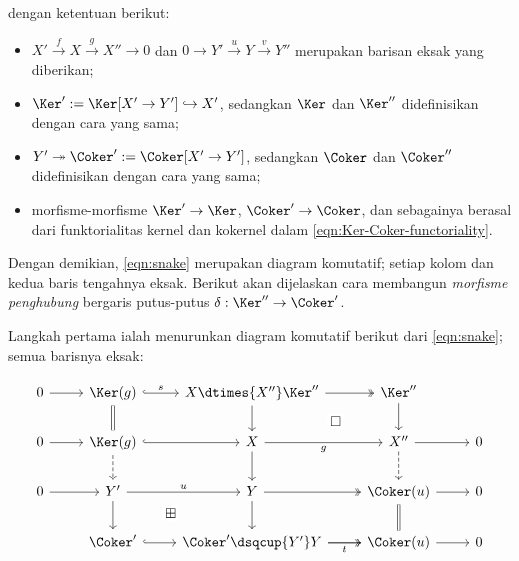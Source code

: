 dengan ketentuan berikut:
\begin{itemize}
	\item $X' \xrightarrow{f} X \xrightarrow{g} X'' \to 0$ dan
	$0 \to Y' \xrightarrow{u} Y \xrightarrow{v} Y''$ merupakan barisan eksak
	yang diberikan;
	\item $\Ker' := \Ker[X' \to Y'] \hookrightarrow X'$, sedangkan $\Ker$ dan
	$\Ker''$ didefinisikan dengan cara yang sama;
	\item $Y' \twoheadrightarrow \Coker' := \Coker[X' \to Y']$, sedangkan
	$\Coker$ dan $\Coker''$ didefinisikan dengan cara yang sama;
	\item morfisme-morfisme $\Ker' \to \Ker$, $\Coker' \to \Coker$, dan
	sebagainya berasal dari funktorialitas kernel dan kokernel dalam
	\eqref{eqn:Ker-Coker-functoriality}.
\end{itemize}

Dengan demikian, \eqref{eqn:snake} merupakan diagram komutatif; setiap
kolom dan kedua baris tengahnya eksak. Berikut akan dijelaskan cara
membangun \emph{morfisme penghubung} bergaris putus-putus
$\delta: \Ker'' \to \Coker'$.

Langkah pertama ialah menurunkan diagram komutatif berikut dari
\eqref{eqn:snake}; semua barisnya eksak:

\begin{equation}\label{eqn:snake-conn}
\begin{tikzcd}
	0 \arrow[r] & \Ker(g) \arrow[hookrightarrow, r, "s"] \arrow[equal, d] & X \dtimes{X''} \Ker'' \arrow[twoheadrightarrow, r] \arrow[d] \arrow[phantom, rd, "\Box" description] & \Ker'' \arrow[d] & \\
	0 \arrow[r] & \Ker(g) \arrow[hookrightarrow, r] \arrow[dashrightarrow, d] & X \arrow[r, "g"'] \arrow[d] & X'' \arrow[dashrightarrow, d] \arrow[r] & 0 \\
	0 \arrow[r] & Y' \arrow[r, "u"] \arrow[d] & Y \arrow[twoheadrightarrow, r] \arrow[d] & \Coker(u) \arrow[equal, d] \arrow[r] & 0 \\
	& \Coker' \arrow[hookrightarrow, r] & \Coker' \dsqcup{Y'} Y \arrow[r] \arrow[phantom, lu, "\boxplus" description] \arrow[twoheadrightarrow, r, "t"'] & \Coker(u) \arrow[r] & 0
\end{tikzcd}
\end{equation}

